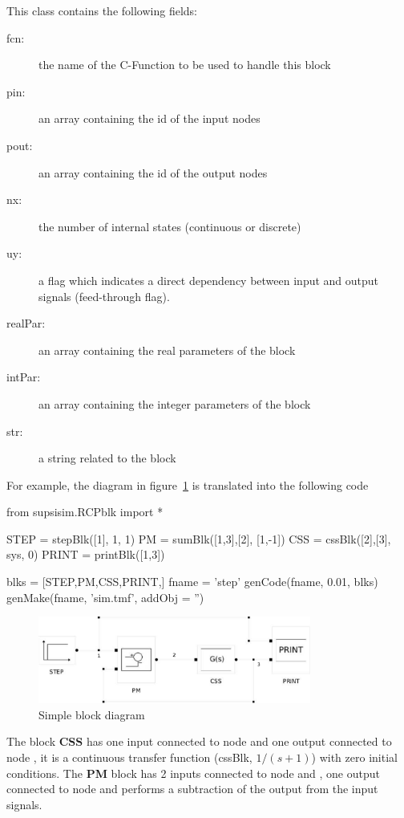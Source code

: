 This class contains the following fields:

\begin{description}
\item[fcn:] the name of the C-Function to be used to handle this block
\item [pin:] an array containing the id of the input nodes
\item [pout:] an array containing the id of the output nodes
\item [nx:] the number of internal states (continuous or discrete)
\item [uy:] a flag which indicates a direct dependency between input and 
output signals (feed-through flag).
\item [realPar:] an array containing the real parameters of the block
\item [intPar:] an array containing the integer parameters of the block
\item [str:] a string related to the block
\end{description}

For example, the diagram in figure~\ref{F18} is translated into the following 
code

\begin{code}
from supsisim.RCPblk import *

STEP = stepBlk([1],  1,  1)
PM = sumBlk([1,3],[2],  [1,-1])
CSS = cssBlk([2],[3],  sys,  0)
PRINT = printBlk([1,3])

blks = [STEP,PM,CSS,PRINT,]
fname = 'step'
genCode(fname, 0.01, blks)
genMake(fname, 'sim.tmf', addObj = '')
\end{code}



\begin{figure}[htbp]	%
\centering
\includegraphics[width=0.8\textwidth]{eps/step1.eps}
\caption{Simple block diagram}
\label{F18}
\end{figure}

The block \textbf{CSS} has one input connected to node  and 
one output connected to node , it is a continuous transfer function 
(cssBlk, $1/(s+1)$) with zero initial conditions. The \textbf{PM} block has 
2 inputs connected to node  and , one output 
connected to node  and performs a subtraction of the output from the 
input signals.

